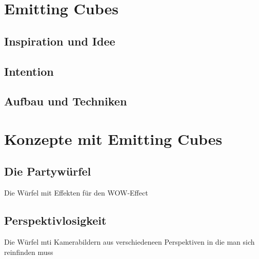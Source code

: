 \documentclass[pdftex,12pt,a4paper]{report}
\begin{document}
\tableofcontents
\newpage

\chapter{Emitting Cubes }
\section{Inspiration und Idee}
\section{Intention}
\section{Aufbau und Techniken}



\chapter{Konzepte mit Emitting Cubes}
\section{Die Partywürfel}
Die Würfel mit Effekten für den WOW-Effect

\section{Perspektivlosigkeit}
Die Würfel mti Kamerabildern aus verschiedeneen Perspektiven in die man sich reinfinden muss 
\end{document}
